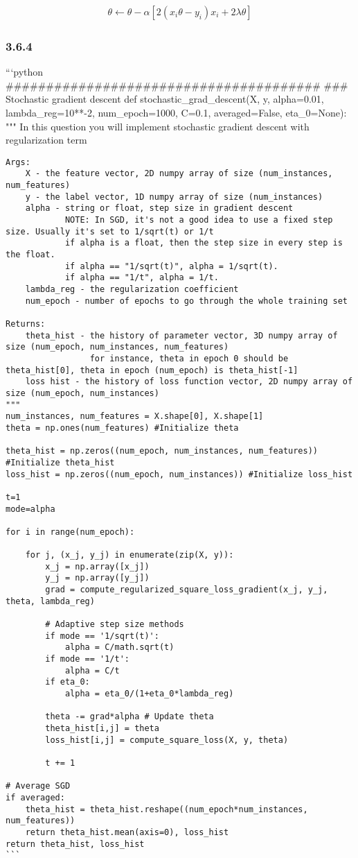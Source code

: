 \documentclass[11pt]{article}
\begin{document}
    \begin{align}
\theta \leftarrow \theta - \alpha[2(x_i\theta - y_i)x_i + 2\lambda \theta]
\end{align}

    \subsubsection{3.6.4}\label{section}

    ```python
\#\#\#\#\#\#\#\#\#\#\#\#\#\#\#\#\#\#\#\#\#\#\#\#\#\#\#\#\#\#\#\#\#\#\#\#\#\#\#
\#\#\# Stochastic gradient descent def stochastic\_grad\_descent(X, y,
alpha=0.01, lambda\_reg=10**-2, num\_epoch=1000, C=0.1, averaged=False,
eta\_0=None): """ In this question you will implement stochastic
gradient descent with regularization term

\begin{verbatim}
Args:
    X - the feature vector, 2D numpy array of size (num_instances, num_features)
    y - the label vector, 1D numpy array of size (num_instances)
    alpha - string or float, step size in gradient descent
            NOTE: In SGD, it's not a good idea to use a fixed step size. Usually it's set to 1/sqrt(t) or 1/t
            if alpha is a float, then the step size in every step is the float.
            if alpha == "1/sqrt(t)", alpha = 1/sqrt(t).
            if alpha == "1/t", alpha = 1/t.
    lambda_reg - the regularization coefficient
    num_epoch - number of epochs to go through the whole training set

Returns:
    theta_hist - the history of parameter vector, 3D numpy array of size (num_epoch, num_instances, num_features)
                 for instance, theta in epoch 0 should be theta_hist[0], theta in epoch (num_epoch) is theta_hist[-1]
    loss hist - the history of loss function vector, 2D numpy array of size (num_epoch, num_instances)
"""
num_instances, num_features = X.shape[0], X.shape[1]
theta = np.ones(num_features) #Initialize theta

theta_hist = np.zeros((num_epoch, num_instances, num_features)) #Initialize theta_hist
loss_hist = np.zeros((num_epoch, num_instances)) #Initialize loss_hist

t=1
mode=alpha

for i in range(num_epoch):

    for j, (x_j, y_j) in enumerate(zip(X, y)):
        x_j = np.array([x_j])
        y_j = np.array([y_j])
        grad = compute_regularized_square_loss_gradient(x_j, y_j, theta, lambda_reg)
        
        # Adaptive step size methods
        if mode == '1/sqrt(t)':
            alpha = C/math.sqrt(t)
        if mode == '1/t':
            alpha = C/t
        if eta_0:
            alpha = eta_0/(1+eta_0*lambda_reg)

        theta -= grad*alpha # Update theta
        theta_hist[i,j] = theta
        loss_hist[i,j] = compute_square_loss(X, y, theta)

        t += 1
        
# Average SGD
if averaged:
    theta_hist = theta_hist.reshape((num_epoch*num_instances, num_features))
    return theta_hist.mean(axis=0), loss_hist
return theta_hist, loss_hist
```
\end{verbatim}
\end{document}
